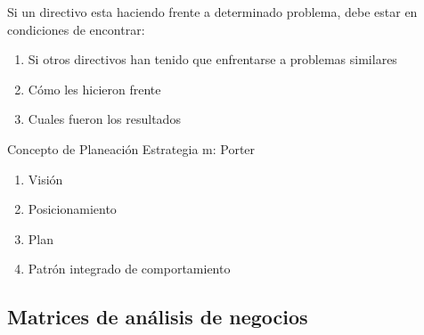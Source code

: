 Si un directivo esta haciendo frente a determinado problema, debe estar en condiciones de encontrar:
\begin{enumerate}
    \item Si otros directivos han tenido que enfrentarse a problemas similares
    \item Cómo les hicieron frente
    \item Cuales fueron los resultados
\end{enumerate}
Concepto de Planeación Estrategia m: Porter
\begin{enumerate}
    \item Visión
    \item Posicionamiento
    \item Plan
    \item Patrón integrado de comportamiento
\end{enumerate}

\subsection{Matrices de análisis de negocios}
